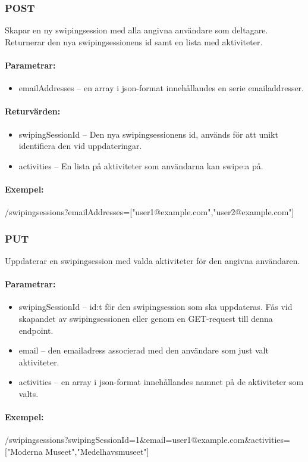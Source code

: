 \documentclass{article}
\begin{document}
\subsubsection*{POST}

Skapar en ny swipingsession med alla angivna användare som deltagare. Returnerar den nya swipingsessionens id samt en lista med aktiviteter.

\paragraph{Parametrar:}

\begin{itemize}		
	\item emailAddresses -- en array i json-format innehållandes en serie emailaddresser.			
\end{itemize}		

\paragraph{Returvärden:}
\label{par:swipingsessions_returv_rden_}

\begin{itemize}
    \item swipingSessionId --  Den nya swipingsessionens id, används för att unikt identifiera den vid uppdateringar.
    \item activities -- En lista på aktiviteter som användarna kan swipe:a på.
\end{itemize}

\paragraph{Exempel:} /swipingsessions?emailAddresses=["user1@example.com","user2@example.com"] 

\subsubsection*{PUT}

Uppdaterar en swipingsession med valda aktiviteter för den angivna användaren.

\paragraph{Parametrar:}

\begin{itemize}

	\item swipingSessionId -- id:t för den swipingsession som ska uppdateras. Fås vid skapandet av swipingsessionen eller genom en
		GET-request till denna endpoint.
	\item email -- den emailadress associerad med den användare som just valt aktiviteter.
	\item activities -- en array i json-format innehållandes namnet på de aktiviteter som valts.

\end{itemize}

\paragraph{Exempel:} /swipingsessions?swipingSessionId=1\&email=user1@example.com\&activities=["Moderna Museet","Medelhavsmuseet"]
\end{document}
